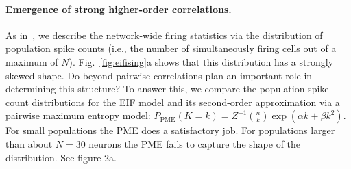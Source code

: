 \documentclass[%
 reprint,
 twocolumn,
 amsmath,amssymb,
 aps,
floatfix,
]{revtex4}
\begin{document}
\paragraph*{Emergence of strong higher-order correlations.}  As in~\cite{Macke,Barreiro,Panzeri,Amarietal03}, we describe the network-wide firing statistics via the distribution of population spike counts (i.e., the number of simultaneously firing cells out of a maximum of $N$).  Fig.~\ref{fig:eifising}a shows that this distribution has a strongly skewed shape.  Do beyond-pairwise correlations plan an important role in determining this structure?  To answer this, we compare the population spike-count distributions for the EIF model and its second-order approximation via a pairwise maximum entropy model: $P_{\text{PME}}(K = k) = Z^{-1} \binom{n}{k}\exp{(\alpha k + \beta k^2)}$. For small populations the PME does a satisfactory job. For populations larger than about $N=30$ neurons the PME fails to capture the shape of the distribution. 
See figure 2a.
\end{document}
